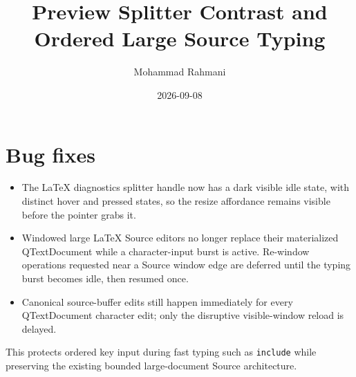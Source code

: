 \documentclass[a4paper]{article}
\title{Preview Splitter Contrast and Ordered Large Source Typing}
\date{2026-09-08}
\author{Mohammad Rahmani}
\begin{document}
   \maketitle

   \section{Bug fixes}

   \begin{itemize}
      \item The LaTeX diagnostics splitter handle now has a dark visible idle
      state, with distinct hover and pressed states, so the resize affordance
      remains visible before the pointer grabs it.
      \item Windowed large LaTeX Source editors no longer replace their
      materialized QTextDocument while a character-input burst is active.
      Re-window operations requested near a Source window edge are deferred
      until the typing burst becomes idle, then resumed once.
      \item Canonical source-buffer edits still happen immediately for every
      QTextDocument character edit; only the disruptive visible-window reload
      is delayed.
   \end{itemize}

   This protects ordered key input during fast typing such as
   \verb|include| while preserving the existing bounded large-document Source
   architecture.

   
   
\end{document}
